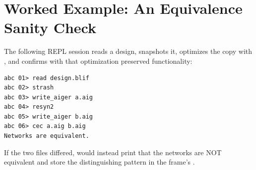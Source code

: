 \section{Worked Example: An Equivalence Sanity Check}

The following REPL session reads a design, snapshots it, optimizes the copy
with , and confirms with  that optimization preserved
functionality:

\begin{lstlisting}[style=abcshell]
abc 01> read design.blif
abc 02> strash
abc 03> write_aiger a.aig
abc 04> resyn2
abc 05> write_aiger b.aig
abc 06> cec a.aig b.aig
Networks are equivalent.
\end{lstlisting}

If the two files differed,  would instead print that the networks are
NOT equivalent and store the distinguishing pattern in the frame's .

